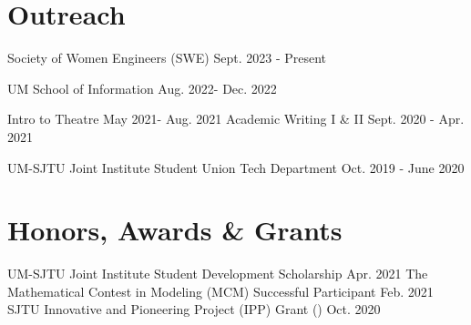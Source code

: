 

\section{\textbf{Outreach}}
\vspace{-0.4mm}
\resumeSubHeadingListStart
{} %
    {Society of Women Engineers (SWE)} %
    {Sept. 2023 - Present} %
        \vspace{-1.5mm}  
        
    {UM School of Information} %
    {Aug. 2022- Dec. 2022} %
        \vspace{-1.5mm}  



    {Intro to Theatre} %
    {May 2021- Aug. 2021} %
        \vspace{-1.5mm}  
    {Academic Writing I \& II} %
    {Sept. 2020 - Apr. 2021} %
       \vspace{-1.5mm}  

    {UM-SJTU Joint Institute Student Union Tech Department} %
    {Oct. 2019 - June 2020} %
      \vspace{-1.5mm}  
        
\resumeSubHeadingListEnd
\vspace{-5mm}


\section{\textbf{Honors, Awards \& Grants}}
\vspace{-0.4mm}
\resumeSubHeadingListStart 

\resumePOR{} %
    {UM-SJTU Joint Institute Student Development Scholarship} %
    {Apr. 2021} %
      \vspace{-1.5mm}  
\resumePOR{} %
    {The Mathematical Contest in Modeling (MCM) Successful Participant} %
    {Feb. 2021} %
      \vspace{-1.5mm}  
\resumePOR{} %
{SJTU Innovative and Pioneering Project (IPP) Grant ()} %
    {Oct. 2020} %
      \vspace{-1.5mm}  

